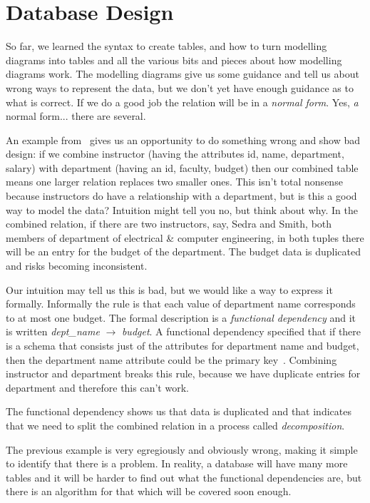 




\section*{Database Design}
So far, we learned the syntax to create tables, and how to turn modelling diagrams into tables and all the various bits and pieces about how modelling diagrams work. The modelling diagrams give us some guidance and tell us about wrong ways to represent the data, but we don't yet have enough guidance as to what is correct. If we do a good job the relation will be in a \textit{normal form}. Yes, \textit{a} normal form... there are several.

An example from~\cite{dsc} gives us an opportunity to do something wrong and show bad design: if we combine instructor (having the attributes id, name, department, salary) with department (having an id, faculty, budget) then our combined table means one larger relation replaces two smaller ones. This isn't total nonsense because instructors do have a relationship with a department, but is this a good way to model the data? Intuition might tell you no, but think about why. In the combined relation, if there are two instructors, say, Sedra and Smith, both members of department of electrical \& computer engineering, in both tuples there will be an entry for the budget of the department. The budget data is duplicated and risks becoming inconsistent.

Our intuition may tell us this is bad, but we would like a way to express it formally. Informally the rule is that each value of department name corresponds to at most one budget. The formal description is a \textit{functional dependency} and it is written \textit{dept\_name} $\rightarrow$ \textit{budget}. A functional dependency specified that if there is a schema that consists just of the attributes for department name and budget, then the department name attribute could be the primary key~\cite{dsc}. Combining instructor and department breaks this rule, because we have duplicate entries for department and therefore this can't work.

The functional dependency shows us that data is duplicated and that indicates that we need to split the combined relation in a process called \textit{decomposition}.

The previous example is very egregiously and obviously wrong, making it simple to identify that there is a problem. In reality, a database will have many more tables and it will be harder to find out what the functional dependencies are, but there is an algorithm for that which will be covered soon enough.


